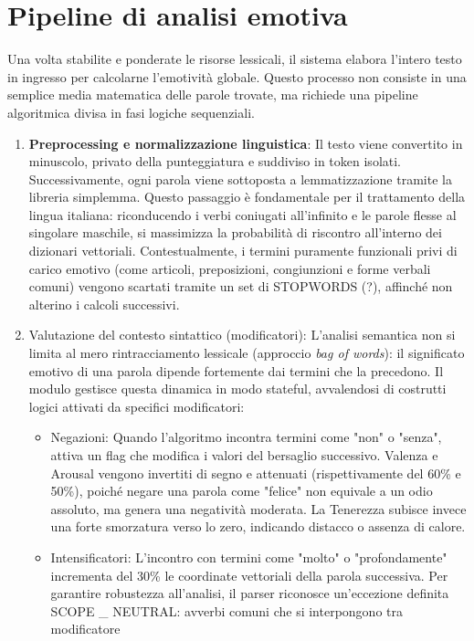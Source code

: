\section{Pipeline di analisi emotiva}
Una volta stabilite e ponderate le risorse lessicali, il sistema elabora l'intero testo in ingresso per calcolarne l'emotività globale. 
Questo processo non consiste in una semplice media matematica delle parole trovate, ma richiede una pipeline algoritmica divisa in fasi logiche sequenziali.
\begin{enumerate}
    \item \textbf{Preprocessing e normalizzazione linguistica}: Il testo viene convertito in minuscolo, privato della punteggiatura e suddiviso in 
    token isolati. Successivamente, ogni parola viene sottoposta a lemmatizzazione tramite la libreria simplemma. Questo passaggio è fondamentale 
    per il trattamento della lingua italiana: riconducendo i verbi coniugati all'infinito e le parole flesse al singolare maschile, si massimizza 
    la probabilità di riscontro all'interno dei dizionari vettoriali. Contestualmente, i termini puramente funzionali privi di carico emotivo 
    (come articoli, preposizioni, congiunzioni e forme verbali comuni) vengono scartati tramite un set di STOPWORDS (?), affinché non alterino i 
    calcoli successivi.
    \item Valutazione del contesto sintattico (modificatori): L'analisi semantica non si limita al mero rintracciamento lessicale (approccio \textit{bag of words}): 
    il significato emotivo di una parola dipende fortemente dai termini che la precedono. Il modulo gestisce questa dinamica in modo stateful, 
    avvalendosi di costrutti logici attivati da specifici modificatori:
    \begin{itemize}
        \item Negazioni: Quando l'algoritmo incontra termini come "non" o "senza", attiva un flag che modifica i valori del bersaglio successivo. 
        Valenza e Arousal vengono invertiti di segno e attenuati (rispettivamente del 60\% e 50\%), poiché negare una parola come "felice" non equivale a
        un odio assoluto, ma genera una negatività moderata. La Tenerezza subisce invece una forte smorzatura verso lo zero, indicando distacco o assenza di 
        calore.
        \item Intensificatori: L'incontro con termini come "molto" o "profondamente" incrementa del 30\% le coordinate vettoriali della parola successiva. 
        Per garantire robustezza all'analisi, il parser riconosce un'eccezione definita SCOPE \_ NEUTRAL: avverbi comuni che si interpongono tra modificatore 

\end{itemize}
\end{enumerate}
